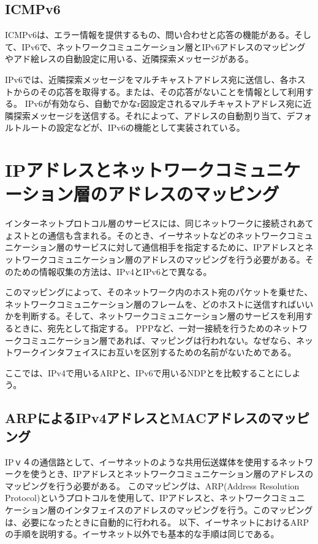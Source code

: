 \subsection{ICMPv6}
ICMPv6は、エラー情報を提供するもの、問い合わせと応答の機能がある。そして、IPv6で、ネットワークコミュニケーション層とIPv6アドレスのマッピングやアド絵レスの自動設定に用いる、近隣探索メッセージがある。

IPv6では、近隣探索メッセージをマルチキャストアドレス宛に送信し、各ホストからのその応答を取得する。または、その応答がないことを情報として利用する。
IPv6が有効なら、自動でかなr図設定されるマルチキャストアドレス宛に近隣探索メッセージを送信する。それによって、アドレスの自動割り当て、デフォルトルートの設定などが、IPv6の機能として実装されている。

\section{IPアドレスとネットワークコミュニケーション層のアドレスのマッピング}

インターネットプロトコル層のサービスには、同じネットワークに接続されあてょストとの通信も含まれる。そのとき、イーサネットなどのネットワークコミュニケーション層のサービスに対して通信相手を指定するために、IPアドレスとネットワークコミュニケーション層のアドレスのマッピングを行う必要がある。そのための情報収集の方法は、IPv4とIPv6とで異なる。

このマッピングによって、そのネットワーク内のホスト宛のパケットを乗せた、ネットワークコミュニケーション層のフレームを、どのホストに送信すればいいかを判断する。そして、ネットワークコミュニケーション層のサービスを利用するときに、宛先として指定する。
PPPなど、一対一接続を行うためのネットワークコミュニケーション層であれば、マッピングは行われない。なぜなら、ネットワークインタフェイスにお互いを区別するための名前がないためである。

ここでは、IPv4で用いるARPと、IPv6で用いるNDPとを比較することにしよう。

\subsection{ARPによるIPv4アドレスとMACアドレスのマッピング}

IPｖ４の通信路として、イーサネットのような共用伝送媒体を使用するネットワークを使うとき、IPアドレスとネットワークコミュニケーション層のアドレスのマッピングを行う必要がある。
このマッピングは、ARP(Address Resolution Protocol)というプロトコルを使用して、IPアドレスと、ネットワークコミュニケーション層のインタフェイスのアドレスのマッピングを行う。このマッピングは、必要になったときに自動的に行われる。
以下、イーサネットにおけるARPの手順を説明する。イーサネット以外でも基本的な手順は同じである。

